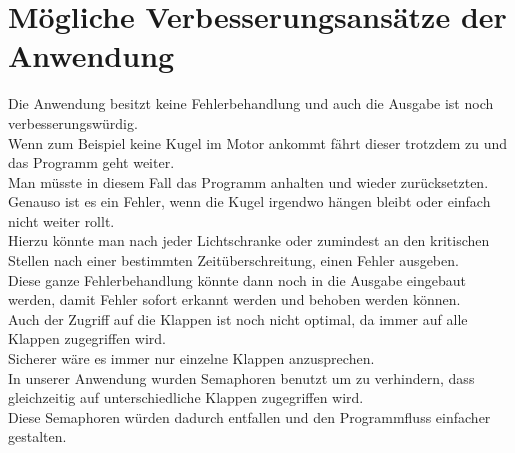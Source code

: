 \section{Mögliche Verbesserungsansätze der Anwendung}
Die Anwendung besitzt keine Fehlerbehandlung und auch die Ausgabe ist noch verbesserungswürdig.\\
Wenn zum Beispiel keine Kugel im Motor ankommt fährt dieser trotzdem zu und das Programm geht weiter.\\
Man müsste in diesem Fall das Programm anhalten und wieder zurücksetzten.\\
Genauso ist es ein Fehler, wenn die Kugel irgendwo hängen bleibt oder einfach nicht weiter rollt.\\
Hierzu könnte man nach jeder Lichtschranke oder zumindest an den kritischen Stellen nach einer bestimmten Zeitüberschreitung, einen Fehler ausgeben.\\
Diese ganze Fehlerbehandlung könnte dann noch in die Ausgabe eingebaut werden, damit Fehler sofort erkannt werden und behoben werden können.\\
Auch der Zugriff auf die Klappen ist noch nicht optimal, da immer auf alle Klappen zugegriffen wird.\\
Sicherer wäre es immer nur einzelne Klappen anzusprechen.\\
In unserer Anwendung wurden Semaphoren benutzt um zu verhindern, dass gleichzeitig auf unterschiedliche Klappen zugegriffen wird.\\
Diese Semaphoren würden dadurch entfallen und den Programmfluss einfacher gestalten.\\  







